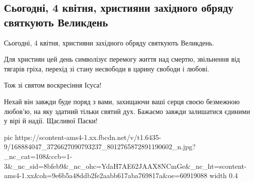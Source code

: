  
 
 
 
 

\subsection{Сьогодні, 4 квітня, християни західного обряду святкують Великдень}
\label{sec:04_04_2021.fb.nashe_prykarpattia.1.velykden}

Сьогодні, 4 квітня, християни західного обряду святкують Великдень. 

Для християн цей день символізує перемогу життя над смертю, звільнення від
тягарів гріха, перехід зі стану несвободи в царину свободи і любові.  

Тож зі святом воскресіння Ісуса! 

Нехай він завжди буде поряд з вами, захищаючи ваші серця своєю безмежною
любов'ю, на яку здатний тільки святий дух. Бажаємо завжди залишатися єдиними у
вірі й надії. Щасливої Паски!

\ifcmt
  pic https://scontent-ams4-1.xx.fbcdn.net/v/t1.6435-9/168884047_3726627090793237_8012765872891190602_n.jpg?_nc_cat=108&ccb=1-3&_nc_sid=8bfeb9&_nc_ohc=YdaH7AE62JAAX8NCmGe&_nc_ht=scontent-ams4-1.xx&oh=9e6b5a48ddb2fe2aabb617aba769817a&oe=60919088
  width 0.4
\fi

